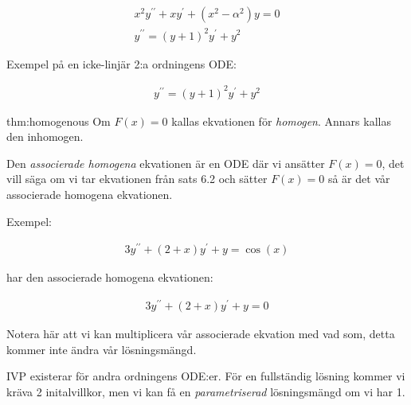 \begin{equation*}
  \begin{gathered}
    x^2y^{\prime\prime}+xy^{\prime}+(x^2-\alpha^2)y=0\\
    y^{\prime\prime} = (y+1)^2y^{\prime}+y^2
  \end{gathered}
\end{equation*}
\par\bigskip

\noindent Exempel på en icke-linjär 2:a ordningens ODE:

\begin{equation*}
  \begin{gathered}
    y^{\prime\prime} = (y+1)^2y^{\prime}+y^2
  \end{gathered}
\end{equation*}
\par\bigskip

\begin{theo}{thm:homogenous}
  Om $F(x)=0$ kallas ekvationen för \textit{homogen}. Annars kallas den inhomogen.
  \par\bigskip
  \noindent Den \textit{associerade homogena} ekvationen är en ODE där vi ansätter $F(x)=0$, det vill säga om vi tar ekvationen från sats 6.2 och sätter $F(x)=0$ så är det vår associerade homogena ekvationen.
\end{theo}
\par\bigskip

\noindent Exempel:


\begin{equation*}
  \begin{gathered}
    3y^{\prime\prime}+(2+x)y^{\prime}+y=\cos(x)
  \end{gathered}
\end{equation*}

\noindent har den associerade homogena ekvationen:


\begin{equation*}
  \begin{gathered}
    3y^{\prime\prime}+(2+x)y^{\prime}+y=0
  \end{gathered}
\end{equation*}
\par\bigskip

\noindent Notera här att vi kan multiplicera vår associerade ekvation med vad som, detta kommer inte ändra vår lösningsmängd.
\par\bigskip

\noindent IVP existerar för andra ordningens ODE:er. För en fullständig lösning kommer vi kräva 2 initalvillkor, men vi kan få en \textit{parametriserad} lösningsmängd om vi har 1.
\par\bigskip
\pagebreak

